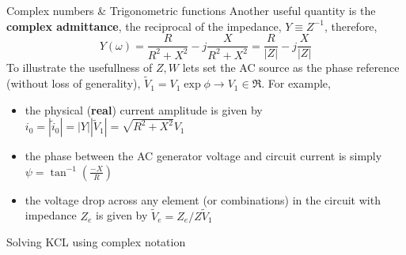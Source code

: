 \begin{frame}[allowframebreaks]{Complex numbers \& Trigonometric functions}
Another useful quantity is the \textbf{complex admittance}, the reciprocal of the impedance, $Y\equiv Z^{-1}$, therefore,
\begin{equation}
  Y(\omega) = \frac{R}{R^2+X^2}-j\frac{X}{R^2+X^2} = \frac{R}{|Z|}-j\frac{X}{|Z|}
\end{equation}
To illustrate the usefullness of $Z,W$ lets set the AC source as the phase reference (without loss of generality), $\tilde{V}_1=V_1\exp\phi\rightarrow V_1\in\Re$. For example,
\begin{itemize}
\item the physical (\textbf{real}) current amplitude is given by $i_0=|\tilde{i}_0|=|Y||\tilde{V}_1|=\sqrt{R^2+X^2}V_1$
\item the phase between the AC generator voltage and circuit current is simply $\psi=\tan^{-1}\left(\frac{-X}{R}\right)$
\item the voltage drop across any element (or combinations) in the circuit with impedance $Z_e$ is given by $\tilde{V}_e=Z_e/Z\tilde{V}_1$
\end{itemize}
 


\end{frame}

%
%

\begin{frame}{Solving KCL using complex notation}

\end{frame}




